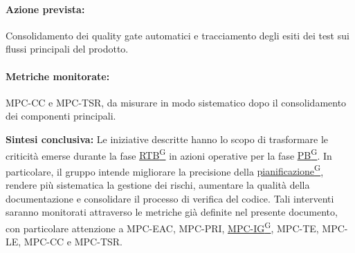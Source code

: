 \documentclass[a4paper,12pt]{article}
\providecommand{\glslink}[2]{\href{https://alittlebyte-19.github.io/Documentazione/glossario.html\#gls-#1}{\underline{#2}\textsuperscript{\scriptsize G}}}
\begin{document}
\paragraph*{Azione prevista:} Consolidamento dei quality gate automatici e tracciamento degli esiti dei test sui flussi principali del prodotto.

\paragraph*{Metriche monitorate:} MPC-CC e MPC-TSR, da misurare in modo sistematico dopo il consolidamento dei componenti principali.

\bigskip

\noindent\textbf{Sintesi conclusiva:} Le iniziative descritte hanno lo scopo di trasformare le criticità emerse durante la fase \glslink{rtb-requirements-and-technology-baseline}{RTB} in azioni operative per la fase \glslink{pb-product-baseline}{PB}. In particolare, il gruppo intende migliorare la precisione della \glslink{pianificazione}{pianificazione}, rendere più sistematica la gestione dei rischi, aumentare la qualità della documentazione e consolidare il processo di verifica del codice. Tali interventi saranno monitorati attraverso le metriche già definite nel presente documento, con particolare attenzione a MPC-EAC, MPC-PRI, \glslink{indice-di-gulpease-mpc-ig}{MPC-IG}, MPC-TE, MPC-LE, MPC-CC e MPC-TSR.
\end{document}
